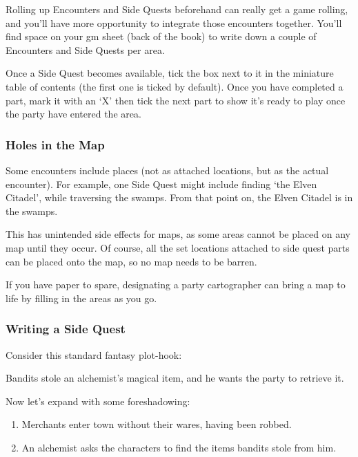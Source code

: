\begin{multicols}{2}
Rolling up Encounters and Side Quests beforehand can really get a game rolling, and you'll have more opportunity to integrate those encounters together.
You'll find space on your \gls{gm} sheet (back of the book) to write down a couple of Encounters and Side Quests per area.

Once a Side Quest becomes available, tick the box next to it in the miniature table of contents (the first one is ticked by default).
Once you have completed a part, mark it with an `X' then tick the next part to show it's ready to play once the party have entered the area.

\subsubsection{Holes in the Map}

Some encounters include places (not as attached locations, but as the actual encounter).
For example, one Side Quest might include finding `the Elven Citadel', while traversing the swamps.
From that point on, the Elven Citadel is in the swamps.

This has unintended side effects for maps, as some areas cannot be placed on any map until they occur.
Of course, all the set locations attached to side quest parts can be placed onto the map, so no map needs to be barren.

If you have paper to spare, designating a party cartographer can bring a map to life by filling in the areas as you go.

\subsubsection{Writing a Side Quest}

Consider this standard fantasy plot-hook:

\begin{exampletext}

	Bandits stole an alchemist's magical item, and he wants the party to retrieve it.

\end{exampletext}

Now let's expand with some foreshadowing:

\begin{enumerate}
	\item
	Merchants enter town without their wares, having been robbed.
	\item
	An alchemist asks the characters to find the items bandits stole from him.
\end{enumerate}


\end{multicols}
